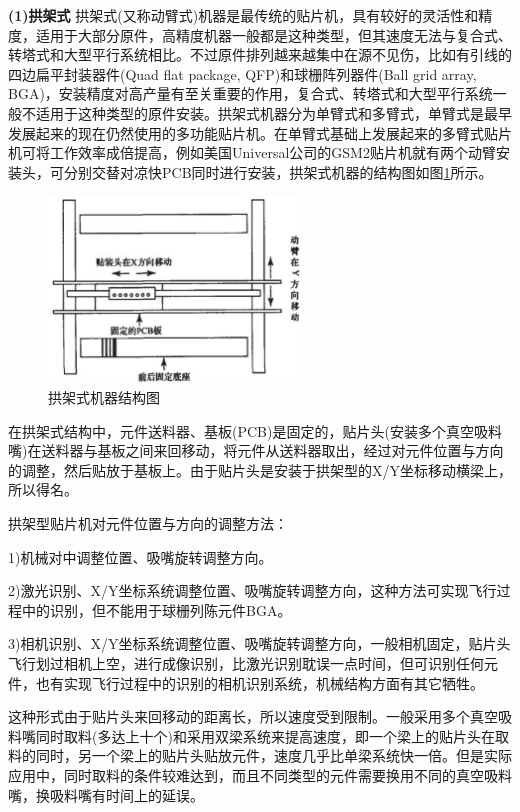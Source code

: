 \documentclass[a4paper]{article}%
\begin{document}
\begin{CJK}{UTF8}{gbsn}
\textbf{(1)拱架式}
拱架式(又称动臂式)机器是最传统的贴片机，具有较好的灵活性和精度，适用于大部分原件，高精度机器一般都是这种类型，但其速度无法与复合式、转塔式和大型平行系统相比。不过原件排列越来越集中在源不见伤，比如有引线的四边扁平封装器件(Quad flat package, QFP)和球栅阵列器件(Ball grid array, BGA)，安装精度对高产量有至关重要的作用，复合式、转塔式和大型平行系统一般不适用于这种类型的原件安装。拱架式机器分为单臂式和多臂式，单臂式是最早发展起来的现在仍然使用的多功能贴片机。在单臂式基础上发展起来的多臂式贴片机可将工作效率成倍提高，例如美国Universal公司的GSM2贴片机就有两个动臂安装头，可分别交替对凉快PCB同时进行安装，拱架式机器的结构图如图\ref{fig301}所示。
\begin{figure}[htb!]
\centering
\includegraphics[width=0.6\textwidth]{fig301.eps}
\caption{拱架式机器结构图}
\label{fig301}
\end{figure}

在拱架式结构中，元件送料器、基板(PCB)是固定的，贴片头(安装多个真空吸料嘴)在送料器与基板之间来回移动，将元件从送料器取出，经过对元件位置与方向的调整，然后贴放于基板上。由于贴片头是安装于拱架型的X/Y坐标移动横梁上，所以得名。

拱架型贴片机对元件位置与方向的调整方法：

1)机械对中调整位置、吸嘴旋转调整方向。

2)激光识别、X/Y坐标系统调整位置、吸嘴旋转调整方向，这种方法可实现飞行过程中的识别，但不能用于球栅列陈元件BGA。

3)相机识别、X/Y坐标系统调整位置、吸嘴旋转调整方向，一般相机固定，贴片头飞行划过相机上空，进行成像识别，比激光识别耽误一点时间，但可识别任何元件，也有实现飞行过程中的识别的相机识别系统，机械结构方面有其它牺牲。

这种形式由于贴片头来回移动的距离长，所以速度受到限制。一般采用多个真空吸料嘴同时取料(多达上十个)和采用双梁系统来提高速度，即一个梁上的贴片头在取料的同时，另一个梁上的贴片头贴放元件，速度几乎比单梁系统快一倍。但是实际应用中，同时取料的条件较难达到，而且不同类型的元件需要换用不同的真空吸料嘴，换吸料嘴有时间上的延误。


\end{CJK}
\end{document}
